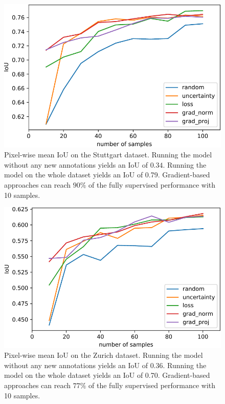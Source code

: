 \documentclass[letterpaper, 10 pt, conference]{ieeeconf}  %
\begin{document}
    \begin{figure}
    \centering
    \includegraphics[width=0.88\linewidth]{pics/pw_iou_stuttgart-crop.pdf}
   		\caption{Pixel-wise mean IoU on the Stuttgart dataset. Running the model without any new annotations yields an IoU of $0.34$. Running the model on the whole dataset yields an IoU of 0.79. Gradient-based approaches can reach $90\%$ of the fully supervised performance with 10 samples.}
		\label{fig:iou_stuttgart}    		
   \end{figure}
   
    \begin{figure}
    \centering
    \includegraphics[width=0.88\linewidth]{pics/pw_iou_zurich-crop.pdf}
   		\caption{Pixel-wise mean IoU on the Zurich dataset. Running the model without any new annotations yields an IoU of $0.36$. Running the model on the whole dataset yields an IoU of 0.70. Gradient-based approaches can reach $77\%$ of the fully supervised performance with 10 samples.}
		\label{fig:iou_zurich}    		
   \end{figure}
   
\end{document}
